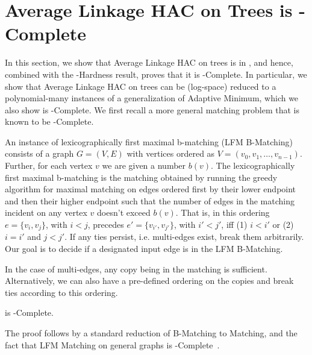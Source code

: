 \section{Average Linkage HAC on Trees is \texorpdfstring{\CC}{CC}-Complete}
In this section, we show that Average Linkage HAC on trees is in \CC, and hence, combined with the \CC-Hardness result, proves that it is \CC-Complete. In particular, we show that Average Linkage HAC on trees can be (log-space) reduced to a polynomial-many instances of a generalization of Adaptive Minimum, which we also show is \CC-Complete. We first recall a more general matching problem that is known to be \CC-Complete.

\begin{problem}[\lfbm]\label{dfn:LFBMM} An instance of lexicographically first maximal b-matching (LFM B-Matching) consists of a graph $G=(V, E)$ with vertices ordered as $V = (v_0, v_1, \ldots, v_{n-1})$. Further, for each vertex $v$ we are given a number $b(v)$. The lexicographically first maximal b-matching is the matching obtained by running the greedy algorithm for maximal matching on edges ordered first by their lower endpoint and then their higher endpoint such that the number of edges in the matching incident on any vertex $v$ doesn't exceed $b(v)$. That is, in this ordering $e = \{v_i, v_j\}$, with $i<j$, precedes $e' = \{v_{i'}, v_{j'}\}$, with $i'<j'$, iff (1) $i < i'$ or (2) $i = i'$ and $j < j'$. If any ties persist, i.e. multi-edges exist, break them arbitrarily. Our goal is to decide if a designated input edge is in the LFM B-Matching.
\end{problem}
In the case of multi-edges, any copy being in the matching is sufficient. Alternatively, we can also have a pre-defined ordering on the copies and break ties according to this ordering. 

\begin{theorem}\label{thm:LFBMCCComplete}
    \lfbm is \CC-Complete.
\end{theorem}
The proof follows by a standard reduction of B-Matching to Matching, and the fact that LFM Matching on general graphs is \CC-Complete~\cite{mayr1992complexity}.

